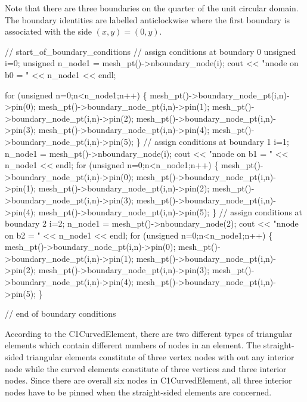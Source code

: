 Note that there are three boundaries on the quarter of the unit circular domain. The boundary identities are labelled anticlockwise where the first boundary is associated with the side $ (x,y) = (0,y). $

 
\begin{DoxyCodeInclude}
 \textcolor{comment}{// start\_of\_boundary\_conditions}
 \textcolor{comment}{// assign conditions at boundary 0}
 \textcolor{keywordtype}{unsigned} i=0;
 \textcolor{keywordtype}{unsigned}  n\_node1 = mesh\_pt()->nboundary\_node(i);
 cout  << \textcolor{stringliteral}{"nnode on b0 = "} << n\_node1 << endl;

 \textcolor{keywordflow}{for} (\textcolor{keywordtype}{unsigned} n=0;n<n\_node1;n++)
  \{
   mesh\_pt()->boundary\_node\_pt(i,n)->pin(0); 
   mesh\_pt()->boundary\_node\_pt(i,n)->pin(1); 
   mesh\_pt()->boundary\_node\_pt(i,n)->pin(2);
   mesh\_pt()->boundary\_node\_pt(i,n)->pin(3);
   mesh\_pt()->boundary\_node\_pt(i,n)->pin(4);
   mesh\_pt()->boundary\_node\_pt(i,n)->pin(5);
  \}
 \textcolor{comment}{// assign conditions at boundary 1}
 i=1;
 n\_node1 = mesh\_pt()->nboundary\_node(i);
 cout  << \textcolor{stringliteral}{"nnode on b1 = "} << n\_node1 << endl;
 \textcolor{keywordflow}{for} (\textcolor{keywordtype}{unsigned} n=0;n<n\_node1;n++)
  \{
   mesh\_pt()->boundary\_node\_pt(i,n)->pin(0); 
   mesh\_pt()->boundary\_node\_pt(i,n)->pin(1); 
   mesh\_pt()->boundary\_node\_pt(i,n)->pin(2);
   mesh\_pt()->boundary\_node\_pt(i,n)->pin(3);
   mesh\_pt()->boundary\_node\_pt(i,n)->pin(4);
   mesh\_pt()->boundary\_node\_pt(i,n)->pin(5);
  \}
 \textcolor{comment}{// assign conditions at boundary 2}
 i=2;
 n\_node1 = mesh\_pt()->nboundary\_node(2);
 cout  << \textcolor{stringliteral}{"nnode on b2 = "} << n\_node1 << endl;
 \textcolor{keywordflow}{for} (\textcolor{keywordtype}{unsigned} n=0;n<n\_node1;n++)
  \{
   mesh\_pt()->boundary\_node\_pt(i,n)->pin(0);
   mesh\_pt()->boundary\_node\_pt(i,n)->pin(1); 
   mesh\_pt()->boundary\_node\_pt(i,n)->pin(2);
   mesh\_pt()->boundary\_node\_pt(i,n)->pin(3);
   mesh\_pt()->boundary\_node\_pt(i,n)->pin(4);
   mesh\_pt()->boundary\_node\_pt(i,n)->pin(5);
  \}
 
 \textcolor{comment}{// end of boundary conditions}

\end{DoxyCodeInclude}


According to the {\ttfamily C1\+Curved\+Element}, there are two different types of triangular elements which contain different numbers of nodes in an element. The straight-\/sided triangular elements constitute of three vertex nodes with out any interior node while the curved elements constitute of three vertices and three interior nodes. Since there are overall six nodes in {\ttfamily C1\+Curved\+Element}, all three interior nodes have to be pinned when the straight-\/sided elements are concerned.

